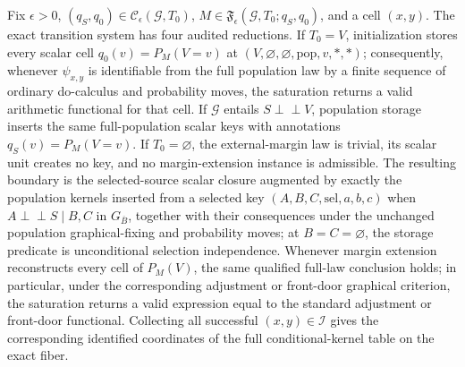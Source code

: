Fix \(\epsilon>0\), \((q_S,q_0)\in\mathcal C_{\epsilon}(\mathcal G,T_0)\), \(M\in\mathfrak F_{\epsilon}(\mathcal G,T_0;q_S,q_0)\), and a cell \((x,y)\). The exact transition system has four audited reductions. If \(T_0=V\), initialization stores every scalar cell \(q_0(v)=P_M(V=v)\) at \((V,\varnothing,\varnothing,\mathrm{pop},v,\ast,\ast)\); consequently, whenever \(\psi_{x,y}\) is identifiable from the full population law by a finite sequence of ordinary do-calculus and probability moves, the saturation returns a valid arithmetic functional for that cell. If \(\mathcal G\) entails \(S\perp\!\!\!\perp V\), population storage inserts the same full-population scalar keys with annotations \(q_S(v)=P_M(V=v)\). If \(T_0=\varnothing\), the external-margin law is trivial, its scalar unit creates no key, and no margin-extension instance is admissible. The resulting boundary is the selected-source scalar closure augmented by exactly the population kernels inserted from a selected key \((A,B,C,\mathrm{sel},a,b,c)\) when \(A\perp\!\!\!\perp S\mid B,C\) in \(G_{\overline B}\), together with their consequences under the unchanged population graphical-fixing and probability moves; at \(B=C=\varnothing\), the storage predicate is unconditional selection independence. Whenever margin extension reconstructs every cell of \(P_M(V)\), the same qualified full-law conclusion holds; in particular, under the corresponding adjustment or front-door graphical criterion, the saturation returns a valid expression equal to the standard adjustment or front-door functional. Collecting all successful \((x,y)\in\mathcal I\) gives the corresponding identified coordinates of the full conditional-kernel table on the exact fiber.